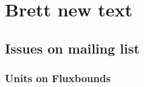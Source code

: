 
\section{ Brett new text }
\subsection{ Issues on mailing list }
\subsubsection{ Units on Fluxbounds }
